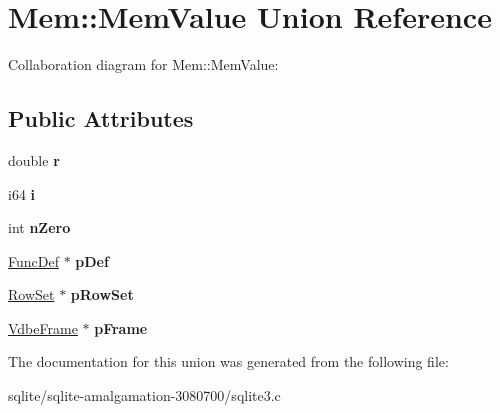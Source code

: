 \hypertarget{union_mem_1_1_mem_value}{\section{Mem\+:\+:Mem\+Value Union Reference}
\label{union_mem_1_1_mem_value}
}


Collaboration diagram for Mem\+:\+:Mem\+Value\+:
\subsection*{Public Attributes}
\begin{DoxyCompactItemize}
\item 
\hypertarget{union_mem_1_1_mem_value_a1b30b01a5b7a3b337eeec4f39fb2a60c}{double {\bfseries r}}\label{union_mem_1_1_mem_value_a1b30b01a5b7a3b337eeec4f39fb2a60c}

\item 
\hypertarget{union_mem_1_1_mem_value_ac783c60cc4b1c0893931c997aa04ded6}{i64 {\bfseries i}}\label{union_mem_1_1_mem_value_ac783c60cc4b1c0893931c997aa04ded6}

\item 
\hypertarget{union_mem_1_1_mem_value_a23976c454e79a60ca692305825792ca8}{int {\bfseries n\+Zero}}\label{union_mem_1_1_mem_value_a23976c454e79a60ca692305825792ca8}

\item 
\hypertarget{union_mem_1_1_mem_value_ad91c4fa3bebcc8bd9efa862841fd928d}{\hyperlink{struct_func_def}{Func\+Def} $\ast$ {\bfseries p\+Def}}\label{union_mem_1_1_mem_value_ad91c4fa3bebcc8bd9efa862841fd928d}

\item 
\hypertarget{union_mem_1_1_mem_value_ab8b5abb605d926c611818285ecb3f7c5}{\hyperlink{struct_row_set}{Row\+Set} $\ast$ {\bfseries p\+Row\+Set}}\label{union_mem_1_1_mem_value_ab8b5abb605d926c611818285ecb3f7c5}

\item 
\hypertarget{union_mem_1_1_mem_value_aa86f6085bfafd8a9ab3f41ac553f49fa}{\hyperlink{struct_vdbe_frame}{Vdbe\+Frame} $\ast$ {\bfseries p\+Frame}}\label{union_mem_1_1_mem_value_aa86f6085bfafd8a9ab3f41ac553f49fa}

\end{DoxyCompactItemize}


The documentation for this union was generated from the following file\+:\begin{DoxyCompactItemize}
\item 
sqlite/sqlite-\/amalgamation-\/3080700/sqlite3.\+c\end{DoxyCompactItemize}

